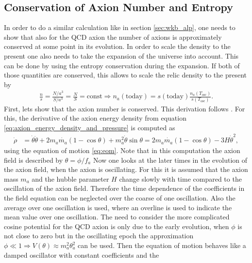 \documentclass[a4paper, 12pt]{article}
\begin{document}
\subsection{Conservation of Axion Number and Entropy}
\label{sec:thermo}
In order to do a similar calculation like in section
\ref{sec:wkb_alp},
one needs to show that
also for the QCD axion the number of axions is approximately conserved at some point
in its evolution. In order to scale the density to the present one also needs to take
the expansion of the universe into account. This can be done
by using the entropy conservation during the expansion.
If both of those quantities are conserved,
this allows to scale the relic density to the present by
\begin{align}
    \label{eq:n_over_s}
    \frac{n}{s} = \frac{N / a^3}{S / a^3} = \frac{N}{S} = \mathrm{const}
    \Rightarrow n_a(\mathrm{today}) = s(\mathrm{today}) \frac{n_a(T_\mathrm{osc})}{s(T_\mathrm{osc})}.
\end{align}
First, lets show that the axion number is conserved.
This derivation follows \cite[Sec. IV, Eq. 28]{AxionCosmoRev}.
For this, the derivative of the axion energy density from equation \ref{eq:axion_energy_density_and_pressure} is computed as
\begin{align*}
    \dot{\rho} &= \dot{\theta} \ddot{\theta} + 2 m_a \dot{m_a} (1 - \cos \theta) + m_a^2 \dot{\theta} \sin \theta
    = 2 m_a \dot{m_a} (1 - \cos \theta) - 3 H \dot{\theta}^2,
\end{align*}
using the equation of motion \ref{eq:eom}.
Note that in this computation the axion field is described by $\theta = \phi / f_a$
Now one looks at the later times in the evolution of the axion field, when the axion
is oscillating.
For this it is assumed
that the axion mass $m_a$ and the hubble parameter $H$ change slowly with time compared to the oscillation of the axion field. Therefore the time dependence of the coefficients
in the field equation can be neglected over the coarse of one oscillation.
Also the average over one oscillation is used, where an overline
is used to indicate the mean value over one oscillation.
The need to consider the more complicated cosine potential for the QCD axion is
only due to the early evolution, when $\phi$ is not close to zero but
in the oscillating epoch the approximation $\phi \ll 1 \Rightarrow V(\theta) \approx m_a^2 \theta_a^2$ can be used.
Then the equation of motion behaves like a damped oscillator with constant coefficients and the
\end{document}
